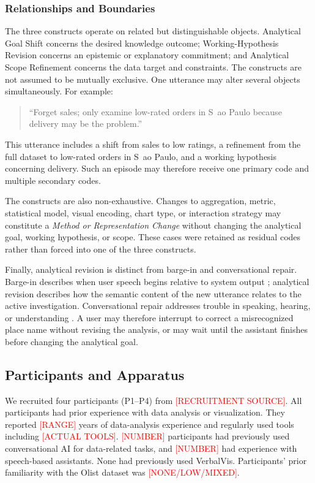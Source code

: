 \documentclass[journal]{IEEEtran}
\begin{document}
\subsubsection{Relationships and Boundaries}

The three constructs operate on related but distinguishable objects.
Analytical Goal Shift concerns the desired knowledge outcome;
Working-Hypothesis Revision concerns an epistemic or explanatory commitment;
and Analytical Scope Refinement concerns the data target and constraints. The
constructs are not assumed to be mutually exclusive. One utterance may alter
several objects simultaneously. For example:

\begin{quote}
``Forget sales; only examine low-rated orders in S~ao Paulo because delivery
may be the problem.''
\end{quote}

This utterance includes a shift from sales to low ratings, a refinement from
the full dataset to low-rated orders in S~ao Paulo, and a working hypothesis
concerning delivery. Such an episode may therefore receive one primary code
and multiple secondary codes.

The constructs are also non-exhaustive. Changes to aggregation, metric,
statistical model, visual encoding, chart type, or interaction strategy may
constitute a \emph{Method or Representation Change} without changing the
analytical goal, working hypothesis, or scope. These cases were retained as
residual codes rather than forced into one of the three constructs.

Finally, analytical revision is distinct from barge-in and conversational
repair. Barge-in describes when user speech begins relative to system output
\cite{skantze2021turntaking}; analytical revision describes how the semantic
content of the new utterance relates to the active investigation.
Conversational repair addresses trouble in speaking, hearing, or understanding
\cite{schegloff1977preference}. A user may therefore interrupt to correct a
misrecognized place name without revising the analysis, or may wait until the
assistant finishes before changing the analytical goal.

\subsection{Participants and Apparatus}
\label{sec:formative-participants}

We recruited four participants (P1--P4) from
\textcolor{red}{[RECRUITMENT SOURCE]}. All participants had prior experience
with data analysis or visualization. They reported
\textcolor{red}{[RANGE]} years of data-analysis experience and regularly used
tools including \textcolor{red}{[ACTUAL TOOLS]}.
\textcolor{red}{[NUMBER]} participants had previously used conversational AI
for data-related tasks, and \textcolor{red}{[NUMBER]} had experience with
speech-based assistants. None had previously used VerbalVis.
Participants' prior familiarity with the Olist dataset was
\textcolor{red}{[NONE/LOW/MIXED]}.
\end{document}

